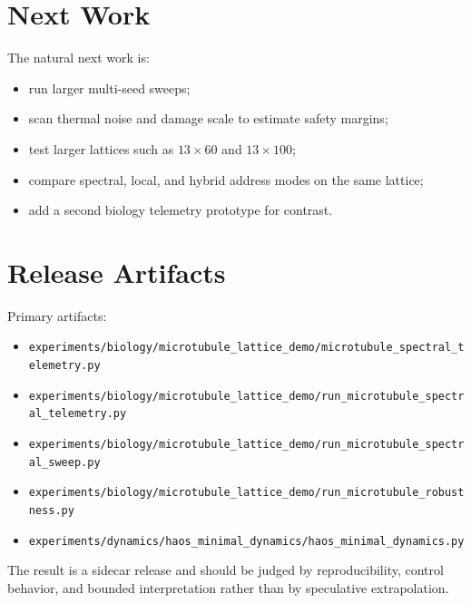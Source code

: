 \documentclass[11pt]{article}
\begin{document}
\section{Next Work}

The natural next work is:
\begin{itemize}
\item run larger multi-seed sweeps;
\item scan thermal noise and damage scale to estimate safety margins;
\item test larger lattices such as $13 \times 60$ and $13 \times 100$;
\item compare spectral, local, and hybrid address modes on the same lattice;
\item add a second biology telemetry prototype for contrast.
\end{itemize}

\section{Release Artifacts}

Primary artifacts:
\begin{itemize}
\item \texttt{experiments/biology/microtubule\_lattice\_demo/microtubule\_spectral\_telemetry.py}
\item \texttt{experiments/biology/microtubule\_lattice\_demo/run\_microtubule\_spectral\_telemetry.py}
\item \texttt{experiments/biology/microtubule\_lattice\_demo/run\_microtubule\_spectral\_sweep.py}
\item \texttt{experiments/biology/microtubule\_lattice\_demo/run\_microtubule\_robustness.py}
\item \texttt{experiments/dynamics/haos\_minimal\_dynamics/haos\_minimal\_dynamics.py}
\end{itemize}

The result is a sidecar release and should be judged by reproducibility, control behavior, and bounded interpretation rather than by speculative extrapolation.
\end{document}
